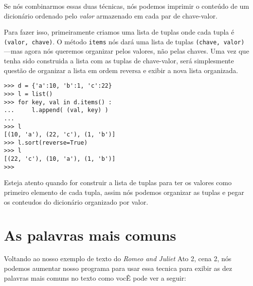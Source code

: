 Se nós combinarmos essas duas técnicas, nós podemos imprimir o conteúdo de
um dicionário ordenado pelo \emph{valor} armazenado em cada par de chave-valor.

Para fazer isso, primeiramente criamos uma lista de tuplas onde cada tupla é
{\tt (valor, chave)}. O método {\tt items} nós dará uma lista de tuplas 
{\tt (chave, valor)} ---mas agora nós queremos organizar pelos valores, não
pelas chaves. Uma vez que tenha sido construida a lista com as tuplas de
chave-valor, será simplesmente questão de organizar a lista em ordem reversa
e exibir a nova lista organizada.

\beforeverb
\begin{verbatim}
>>> d = {'a':10, 'b':1, 'c':22}
>>> l = list()
>>> for key, val in d.items() :
...     l.append( (val, key) )
... 
>>> l
[(10, 'a'), (22, 'c'), (1, 'b')]
>>> l.sort(reverse=True)
>>> l
[(22, 'c'), (10, 'a'), (1, 'b')]
>>> 
\end{verbatim}
\afterverb
%
Esteja atento quando for construir a lista de tuplas para ter os valores como
primeiro elemento de cada tupla, assim nós podemos organizar as tuplas e pegar os
conteudos do dicionário organizado por valor.

\section{As palavras mais comuns}

Voltando ao nosso exemplo de texto do \emph{Romeo and Juliet}
Ato 2, cena 2, nós podemos aumentar nosso programa para usar essa tecnica
para exibir as dez palavras mais comuns no texto como vocÊ pode ver a seguir:

